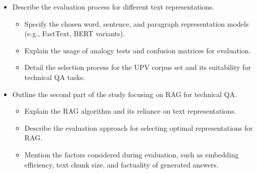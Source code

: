 \begin{itemize}
    \item Describe the evaluation process for different text representations.
      \begin{itemize}
        \item{Specify the chosen word, sentence, and paragraph representation models (e.g., FastText, BERT variants).}
        \item{Explain the usage of analogy tests and confusion matrices for evaluation.}
        \item{Detail the selection process for the UPV corpus set and its suitability for technical QA tasks.}
      \end{itemize}
    \item Outline the second part of the study focusing on RAG for technical QA.
      \begin{itemize}
        \item{Explain the RAG algorithm and its reliance on text representations.}
        \item{Describe the evaluation approach for selecting optimal representations for RAG.}
        \item{Mention the factors considered during evaluation, such as embedding efficiency, text chunk size, and factuality of generated answers.}
      \end{itemize}
\end{itemize}









